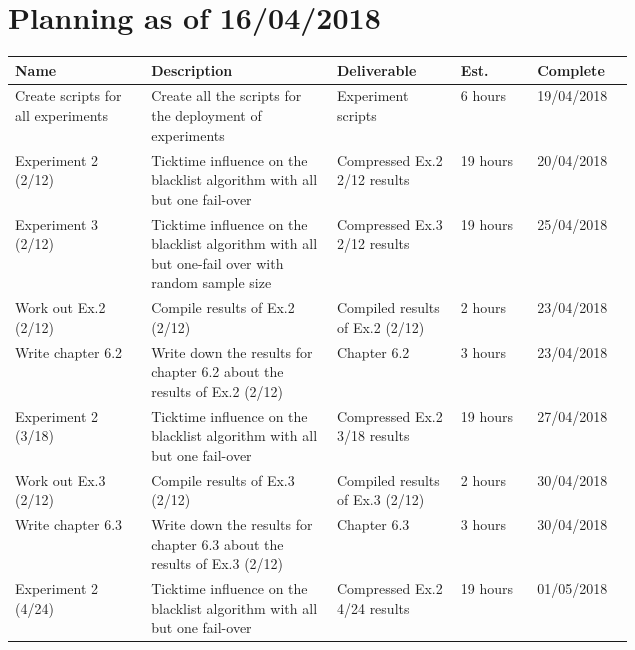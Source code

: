


\section{Planning as of 16/04/2018}
\begin{longtable}{| p{0.22\linewidth} | p{0.3\linewidth}| p{0.2\linewidth} | l | l |}
\hline
\textbf{Name} & \textbf{Description} & \textbf{Deliverable} & \textbf{Est.} & \textbf{Complete} \\ \hline

Create scripts for all experiments & Create all the scripts for the deployment of experiments & Experiment scripts & 6 hours & 19/04/2018 \\
\hline

Experiment 2 (2/12) & Ticktime influence on the blacklist algorithm with all but one fail-over & Compressed Ex.2 2/12 results & 19 hours & 20/04/2018 \\
\hline

Experiment 3 (2/12) & Ticktime influence on the blacklist algorithm with all but one-fail over with random sample size & Compressed Ex.3 2/12 results & 19 hours & 25/04/2018 \\
\hline

Work out Ex.2 (2/12) & Compile results of Ex.2 (2/12) & Compiled results of Ex.2 (2/12) & 2 hours & 23/04/2018 \\
\hline 

Write chapter 6.2 & Write down the results for chapter 6.2 about the results of Ex.2 (2/12) & Chapter 6.2 & 3 hours & 23/04/2018 \\
\hline

Experiment 2 (3/18) & Ticktime influence on the blacklist algorithm with all but one fail-over & Compressed Ex.2 3/18 results & 19 hours & 27/04/2018 \\
\hline

Work out Ex.3 (2/12) & Compile results of Ex.3 (2/12) & Compiled results of Ex.3 (2/12) & 2 hours & 30/04/2018 \\
\hline

Write chapter 6.3 & Write down the results for chapter 6.3 about the results of Ex.3 (2/12) & Chapter 6.3 & 3 hours & 30/04/2018 \\
\hline

Experiment 2 (4/24) & Ticktime influence on the blacklist algorithm with all but one fail-over & Compressed Ex.2 4/24 results & 19 hours & 01/05/2018 \\
\hline


\end{longtable}
